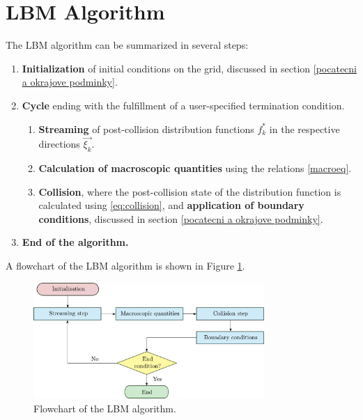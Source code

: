 \section{LBM Algorithm}\label{algoritmus LBM}
The LBM algorithm can be summarized in several steps:
\begin{enumerate}
	\item \textbf{Initialization} of initial conditions on the grid, discussed in section \ref{pocatecni a okrajove podminky}.
	\item \textbf{Cycle} ending with the fulfillment of a user-specified termination condition.
	\begin{enumerate}
		\item \textbf{Streaming} of post-collision distribution functions \( f^{*}_{k} \) in the respective directions \( \vec{\xi_{k}} \).
		\item \textbf{Calculation of macroscopic quantities} using the relations \eqref{macroeq}.
		\item \textbf{Collision}, where the post-collision state of the distribution function is calculated using \eqref{eq:collision}, and \textbf{application of boundary conditions}, discussed in section \ref{pocatecni a okrajove podminky}.
	\end{enumerate}
	\item \textbf{End of the algorithm.}
\end{enumerate}
A flowchart of the LBM algorithm is shown in Figure \ref{fig:algo}.
\begin{figure}[h]
	\centering
	\includegraphics[width=0.78\textwidth]{figures/algo.pdf}
	\caption{Flowchart of the LBM algorithm.}
	\label{fig:algo}
\end{figure}